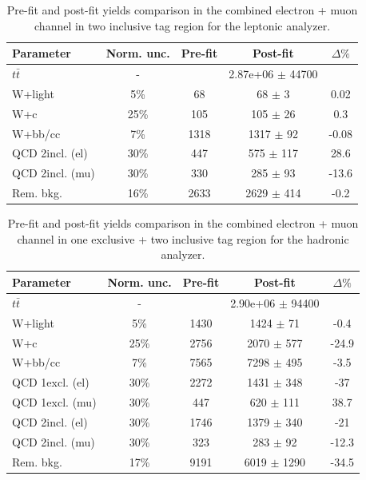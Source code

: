 \begin{table}
\centering 
\begin{tabular}{l|c|c|c|c}
  \hline\hline
  Parameter & Norm. unc. & Pre-fit & Post-fit & $\Delta \%$ \\ \hline\hline
  $t\bar{t}$ 		& - 	&  		& 2.87e+06 $\pm$ 44700	 &  \\ \hline
  W+light 			& 5\% 	& 68 	& 68 $\pm$ 3 	& 0.02 \\
  W+c 	 			& 25\% 	& 105 	& 105 $\pm$ 26 	& 0.3 \\
  W+bb/cc 			& 7\% 	& 1318 	& 1317 $\pm$ 92 & -0.08 \\ \hline
  QCD 2incl. (el) 	& 30\% 	& 447 	& 575 $\pm$ 117 & 28.6 \\
  QCD 2incl. (mu) 	& 30\% 	& 330  	& 285 $\pm$ 93  & -13.6 \\	\hline
  Rem. bkg. 		& 16\% 	& 2633	& 2629 $\pm$ 414 & -0.2 \\ \hline\hline

\end{tabular}
\caption{Pre-fit and post-fit yields comparison in the combined electron + muon channel in two inclusive \bt tag region for the leptonic analyzer.}
\label{tab:prepost_yields_lep2incl}
\end{table}

\begin{table}
\centering 
\begin{tabular}{l|c|c|c|c}
  \hline\hline
  Parameter & Norm. unc. & Pre-fit & Post-fit & $\Delta \%$ \\ \hline\hline
  $t\bar{t}$ 		& - &  & 2.90e+06 $\pm$ 94400	 &  \\ \hline
  W+light 			& 5\% 	& 1430 	& 1424 $\pm$ 71  & -0.4\\
  W+c 	 			& 25\% 	& 2756 	& 2070 $\pm$ 577 & -24.9  \\
  W+bb/cc 			& 7\% 	& 7565 	& 7298 $\pm$ 495 & -3.5 \\ \hline
  QCD 1excl. (el) 	& 30\% 	& 2272 	& 1431 $\pm$ 348 & -37    \\
  QCD 1excl. (mu) 	& 30\% 	& 447 	& 620 $\pm$ 111  & 38.7   \\
  QCD 2incl. (el) 	& 30\% 	& 1746 	& 1379 $\pm$ 340 & -21   \\
  QCD 2incl. (mu) 	& 30\% 	& 323  	& 283 $\pm$ 92   & -12.3 \\	\hline
  Rem. bkg. 		& 17\% 	& 9191 	& 6019 $\pm$ 1290 & -34.5  \\ \hline\hline

\end{tabular}
\caption{Pre-fit and post-fit yields comparison in the combined electron + muon channel in one exclusive + two inclusive \bt tag region for the hadronic analyzer.}
\label{tab:prepost_yields_had_bTag}
\end{table}

